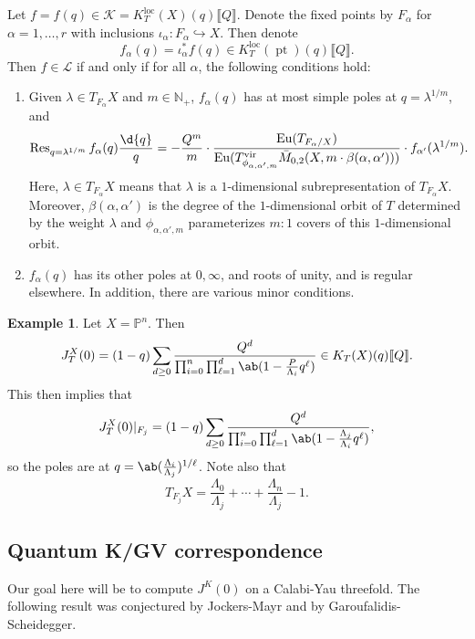 \documentclass{amsart}
\theoremstyle{definition}
\newtheorem{exm}[thm]{Example}
\theoremstyle{remark}
\theoremstyle{plain}
\theoremstyle{definition}
\theoremstyle{remark}
\newcommand{\N}{\mathbb{N}}
\renewcommand{\P}{\mathbb{P}}
\newcommand{\mc}[1]{\mathcal{#1}}
\newcommand{\mr}[1]{\mathrm{#1}}
\newcommand{\on}[1]{\operatorname{#1}}
\newcommand{\1}{\mathbf{1}}
\newcommand{\2}{\mathbf{2}}
\newcommand{\3}{\mathbf{3}}
\newcommand{\vir}{\mr{vir}}
\newcommand{\ps}[1]{\llbracket #1 \rrbracket}
\newcommand{\loc}{\mr{loc}}
\begin{document}
Let \(f = f(q) \in \mc{K} = K_T^{\loc}(X)(q)\ps{Q}\). Denote the fixed points by \(F_{\alpha}\) for \(\alpha = 1, \ldots, r\) with inclusions \(\iota_{\alpha} \colon F_{\alpha} \hookrightarrow X\). Then denote
\[ f_{\alpha}(q) = \iota_{\alpha}^* f(q) \in K_T^{\loc}(\on{pt})(q)\ps{Q}. \]
Then \(f \in \mc{L}\) if and only if for all \(\alpha\), the following conditions hold:
\begin{enumerate}
    \item Given \(\lambda \in T_{F_{\alpha}} X\) and \(m \in \N_+\), \(f_{\alpha}(q)\) has at most simple poles at \(q = \lambda^{1/m}\), and
        \[ \on{Res}_{q = \lambda^{1/m}} f_{\alpha}(q) \frac{\d{q}}{q} = -\frac{Q^m}{m} \cdot \frac{\on{Eu}(T_{F_{\alpha}/X})}{\on{Eu}(T^{\vir}_{\phi_{\alpha,\alpha',m}}\bar{M}_{0,2}(X, m \cdot \beta(\alpha, \alpha')))} \cdot f_{\alpha'}(\lambda^{1/m}). \]
        Here, \(\lambda \in T_{F_{\alpha}}X\) means that \(\lambda\) is a \(1\)-dimensional subrepresentation of \(T_{F_{\alpha}} X\). Moreover, \(\beta(\alpha,\alpha')\) is the degree of the \(1\)-dimensional orbit of \(T\) determined by the weight \(\lambda\) and \(\phi_{\alpha, \alpha', m}\) parameterizes \(m:1\) covers of this \(1\)-dimensional orbit.
    \item \(f_{\alpha}(q)\) has its other poles at \(0, \infty\), and roots of unity, and is regular elsewhere. In addition, there are various minor conditions.
\end{enumerate}

\begin{exm}
    Let \(X = \P^n\). Then
    \[ J_T^X(0) = (1-q) \sum_{d \geq 0} \frac{Q^d}{\prod_{i=0}^n \prod_{\ell = 1}^d \ab(1 - \frac{P}{\Lambda_i} q^{\ell})} \in K_T(X)(q) \ps{Q}. \]
    This then implies that 
    \[ J_T^X(0) |_{F_j} = (1-q) \sum_{d \geq 0} \frac{Q^d}{\prod_{i=0}^n \prod_{\ell = 1}^d \ab(1 - \frac{\Lambda_j}{\Lambda_i}q^{\ell})}, \]
    so the poles are at \(q = \ab(\frac{\Lambda_i}{\Lambda_j})^{1/\ell}\). Note also that
    \[ T_{F_j} X = \frac{\Lambda_0}{\Lambda_j} + \cdots + \frac{\Lambda_n}{\Lambda_j} - 1. \]
\end{exm}

\subsection{Quantum K/GV correspondence}%
\label{sub:Quantum K/GV correspondence}

Our goal here will be to compute \(J^K(0)\) on a Calabi-Yau threefold. The following result was conjectured by Jockers-Mayr and by Garoufalidis-Scheidegger.
\end{document}
